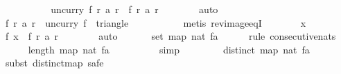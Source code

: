 \begin{isabellebody}
\ \ \ \ \isamarkupfalse%
\isanewline
\ \ \ \ \isamarkupfalse%
\ {\isachardoublequoteopen}{\isacharparenleft}uncurry\ f{\isacharparenright}\ {\isacharparenleft}r{\isacharcomma}\ a\ r{\isacharparenright}\ {\isacharequal}\ f\ r\ {\isacharparenleft}a\ r{\isacharparenright}{\isachardoublequoteclose}\isanewline
\ \ \ \ \ \ \isamarkupfalse%
\ auto\isanewline
\ \ \ \ \isamarkupfalse%
\isanewline
\ \ \ \ \isamarkupfalse%
\ {\isachardoublequoteopen}f\ r\ {\isacharparenleft}a\ r{\isacharparenright}\ {\isasymin}\ {\isacharparenleft}uncurry\ f{\isacharparenright}\ {\isacharbackquote}\ triangle\ {}\ {}\ {}{}{}{}{\isachardoublequoteclose}\isanewline
\ \ \ \ \ \ \isamarkupfalse%
\ {\isacharparenleft}metis\ rev{\isacharunderscore}image{\isacharunderscore}eqI{\isacharparenright}\isanewline
\ \ \ \ \isamarkupfalse%
\ \isamarkupfalse%
\ {\isachardoublequoteopen}x\ {\isachargreater}\ {}{\isachardoublequoteclose}\isanewline
\ \ \ \ \ \ \isamarkupfalse%
\ f{\isacharparenleft}{}{\isacharparenright}\ {\isacharbackquoteopen}x\ {\isacharequal}\ f\ r\ {\isacharparenleft}a\ r{\isacharparenright}{\isacharbackquoteclose}\isanewline
\ \ \ \ \ \ \isamarkupfalse%
\ auto\isanewline
\ \ \isamarkupfalse%
\isanewline
\isanewline
\ \ \isamarkupfalse%
\ {\isachardoublequoteopen}set\ {\isacharparenleft}map\ nat\ {\isacharquery}fa{\isacharparenright}\ {\isacharequal}\ {\isacharbraceleft}{}{\isachardot}{\isachardot}{\isacharless}{}{}{}{}{\isacharplus}{}{\isacharbraceright}{\isachardoublequoteclose}\isanewline
\ \ \isamarkupfalse%
\ {\isacharparenleft}rule\ consecutive{\isacharunderscore}nats{\isacharparenright}\isanewline
\ \ \ \ \isamarkupfalse%
\ {\isachardoublequoteopen}length\ {\isacharparenleft}map\ nat\ {\isacharquery}fa{\isacharparenright}\ {\isacharequal}\ {}{}{}{}{\isachardoublequoteclose}\isanewline
\ \ \ \ \ \ \isamarkupfalse%
\ simp\isanewline
\ \ \isamarkupfalse%
\isanewline
\ \ \ \ \isamarkupfalse%
\ {\isachardoublequoteopen}distinct\ {\isacharparenleft}map\ nat\ {\isacharquery}fa{\isacharparenright}{\isachardoublequoteclose}\isanewline
\ \ \ \ \isamarkupfalse%
\ {\isacharparenleft}subst\ distinct{\isacharunderscore}map{\isacharcomma}\ safe{\isacharparenright}\isanewline

\end{isabellebody}

